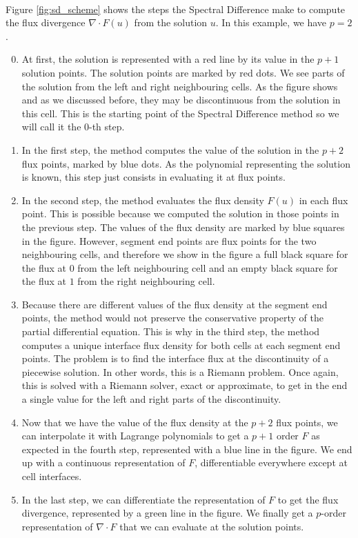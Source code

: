       \paragraph{}
      Figure \ref{fig:sd_scheme} shows the steps the Spectral Difference make to compute the flux divergence $\nabla \cdot F\left(u\right)$ from the solution $u$.
      In this example, we have $p = 2$.
      \begin{enumerate}
        \setcounter{enumi}{-1}
        \item At first, the solution is represented with a red line by its value in the $p + 1$ solution points.
        The solution points are marked by red dots.
        We see parts of the solution from the left and right neighbouring cells.
        As the figure shows and as we discussed before, they may be discontinuous from the solution in this cell.
        This is the starting point of the Spectral Difference method so we will call it the 0-th step.
        \item In the first step, the method computes the value of the solution in the $p + 2$ flux points, marked by blue dots.
        As the polynomial representing the solution is known, this step just consists in evaluating it at flux points.
        \item In the second step, the method evaluates the flux density $F\left(u\right)$ in each flux point.
        This is possible because we computed the solution in those points in the previous step.
        The values of the flux density are marked by blue squares in the figure.
        However, segment end points are flux points for the two neighbouring cells, and therefore we show in the figure a full black square for the flux at $0$ from the left neighbouring cell and an empty black square for the flux at $1$ from the right neighbouring cell.
        \item Because there are different values of the flux density at the segment end points, the method would not preserve the conservative property of the partial differential equation.
        This is why in the third step, the method computes a unique interface flux density for both cells at each segment end points.
        The problem is to find the interface flux at the discontinuity of a piecewise solution.
        In other words, this is a Riemann problem.
        Once again, this is solved with a Riemann solver, exact or approximate, to get in the end a single value for the left and right parts of the discontinuity.
        \item Now that we have the value of the flux density at the $p+2$ flux points, we can interpolate it with Lagrange polynomials to get a $p+1$ order $F$ as expected in the fourth step, represented with a blue line in the figure.
        We end up with a continuous representation of $F$, differentiable everywhere except at cell interfaces.
        \item In the last step, we can differentiate the representation of $F$ to get the flux divergence, represented by a green line in the figure.
        We finally get a $p$-order representation of $\nabla \cdot F$ that we can evaluate at the solution points.
      \end{enumerate}

